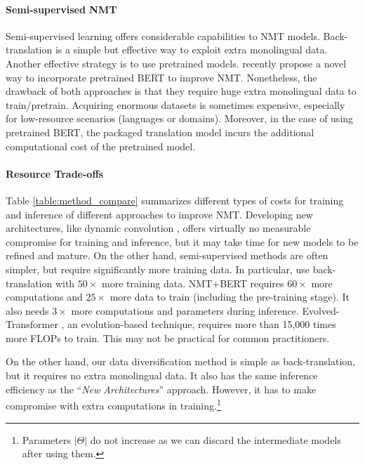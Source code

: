 \documentclass{article}
\begin{document}
\paragraph{Semi-supervised NMT}

Semi-supervised learning offers considerable capabilities to NMT models. Back-translation \citep{backtranslate_sennrich-etal-2016-improving} is a simple but effective way to exploit extra monolingual data. 
Another effective strategy is to use pretrained models. \citet{bert_nmt} recently propose a novel way to incorporate pretrained BERT \citep{devlin2018bert} to improve NMT. 
Nonetheless, the drawback of both approaches is that they require huge extra monolingual data to train/pretrain. Acquiring enormous datasets is sometimes expensive, especially for low-resource scenarios (languages or domains). Moreover, in the case of using pretrained BERT, the packaged translation model incurs the additional computational cost of the pretrained model.

 
\vspace{-0.5em}
\paragraph{Resource Trade-offs}
Table \ref{table:method_compare} summarizes different types of costs for training and inference of different approaches to improve NMT. Developing new architectures, like dynamic convolution \citep{payless_wu2018}, offers virtually no measurable compromise for training and inference, but it may take time for new models to be refined and mature.
On the other hand, semi-supervised methods are often simpler, but require significantly more training data. In particular, \citet{understanding_backtranslation_scale} use back-translation with $50\times$ more training data. NMT+BERT \citep{bert_nmt} requires $60\times$ {more} computations and $25\times$ more data to train (including the pre-training stage). It also needs $3\times$ more computations and parameters during inference. 
Evolved-Transformer \citep{so2019evolved}, an evolution-based technique, requires more than 15,000 times more FLOPs to train. This may not be practical for common practitioners. 
 
On the other hand, our data diversification method is simple as back-translation, but it requires no extra monolingual data. It also has the same inference efficiency as the ``\textit{New Architectures}'' approach. However, it has to make compromise with extra computations in training.\footnote{Parameters $|\Theta|$ do not increase as we can discard the intermediate models after using them.}  
\end{document}
